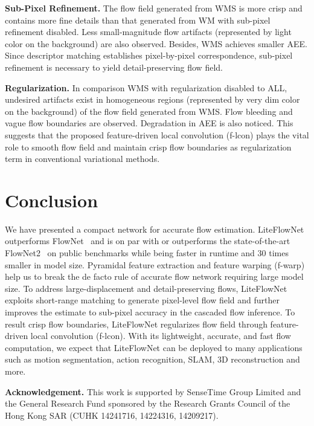 \documentclass[10pt,twocolumn,letterpaper]{article}
\begin{document}
\vspace{0.1cm}
\noindent
\textbf{Sub-Pixel Refinement.} The flow field generated from WMS is more crisp and contains more fine details than that generated from WM with sub-pixel refinement disabled. Less small-magnitude flow artifacts (represented by light color on the background) are also observed. Besides, WMS achieves smaller AEE. Since descriptor matching establishes pixel-by-pixel correspondence, sub-pixel refinement is necessary to yield detail-preserving flow field.

\vspace{0.1cm}
\noindent
\textbf{Regularization.} In comparison WMS with regularization disabled to ALL, undesired artifacts exist in homogeneous regions (represented by very dim color on the background) of the flow field generated from WMS. Flow bleeding and vague flow boundaries are observed. Degradation in AEE is also noticed. This suggests that the proposed feature-driven local convolution (f-lcon) plays the vital role to smooth flow field and maintain crisp flow boundaries as regularization term in conventional variational methods.

\section{Conclusion}
\label{sec:conclusions}
We have presented a compact network for accurate flow estimation. LiteFlowNet outperforms FlowNet~\cite{Fischer15} and is on par with or outperforms the state-of-the-art FlowNet2~\cite{Ilg17} on public benchmarks while being faster in runtime and 30 times smaller in model size. Pyramidal feature extraction and feature warping (f-warp) help us to break the de facto rule of accurate flow network requiring large model size. To address large-displacement and detail-preserving flows, LiteFlowNet exploits short-range matching to generate pixel-level flow field and further improves the estimate to sub-pixel accuracy in the cascaded flow inference. To result crisp flow boundaries, LiteFlowNet regularizes flow field through feature-driven local convolution (f-lcon). With its lightweight, accurate, and fast flow computation, we expect that LiteFlowNet can be deployed to many applications such as motion segmentation, action recognition, SLAM, 3D reconstruction and more.

\vspace{0.1cm}
\noindent\textbf{Acknowledgement.}
This work is supported by SenseTime Group Limited and the General Research Fund sponsored by the Research Grants Council of the Hong Kong SAR (CUHK 14241716, 14224316, 14209217). 
\end{document}
